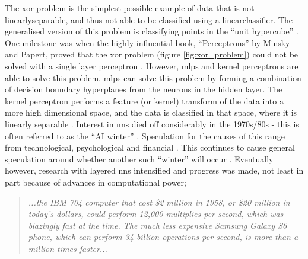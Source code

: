 
The \gls{xor} problem is the simplest possible example of data that is not \gls{linearlyseparable}, and thus not able to be classified using a \gls{linearclassifier}. The generalised version of this problem is classifying points in the \enquote{unit hypercube} \cite[Chapter~4]{haykin}. One milestone was when the highly influential book, \enquote{Perceptrons} by Minsky and Papert, proved that the \gls{xor} problem (figure \ref{fig:xor_problem}) could not be solved with a single layer perceptron \cite[Chapter~4]{perceptron_book}. However, \gls{mlp}s and kernel perceptrons are able to solve this problem. \gls{mlp}s can solve this problem by forming a combination of decision boundary hyperplanes from the neurons in the hidden layer. The kernel perceptron performs a feature (or kernel) transform of the data into a more high dimensional space, and the data is classified in that space, where it is linearly separable \cite{kernel_perceptron_slides}. Interest in \gls{nn}s died off considerably in the 1970s/80s - this is often referred to as the \enquote{AI winter} \cite{ai_winter}. Speculation for the causes of this range from technological, psychological and financial \cite[Chapter~1]{haykin}. This continues to cause general speculation around whether another such \enquote{winter} will occur \cite{ai_winter_spec}. Eventually however, research with layered \gls{nn}s intensified and progress was made, not least in part because of advances in computational power;  \bigskip


\begin{quote}
\textit{...the IBM 704 computer that cost \$2 million in 1958, or \$20 million in today’s dollars, could perform 12,000 multiplies per second, which was blazingly fast at the time. The much less expensive Samsung Galaxy S6 phone, which can perform 34 billion operations per second, is more than a million times faster...\cite{unreasonable_dl}}
\end{quote}

